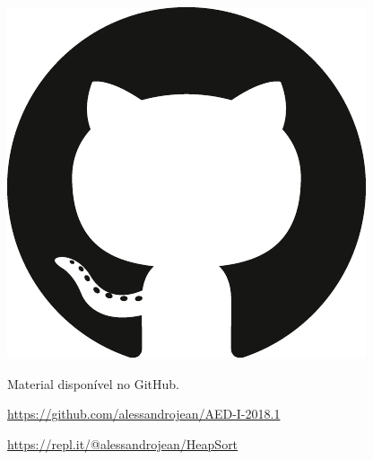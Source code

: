 \documentclass[t, 10pt]{beamer}
\begin{document}
  \begin{frame}[plain, c]
    \begin{center}
      \includegraphics[scale=0.3]{img/github-icon.pdf}
        
      Material disponível no GitHub.
    
      {\footnotesize \url{https://github.com/alessandrojean/AED-I-2018.1}}
      
      {\footnotesize \url{https://repl.it/@alessandrojean/HeapSort}}
    \end{center}
  \end{frame}
\end{document}
